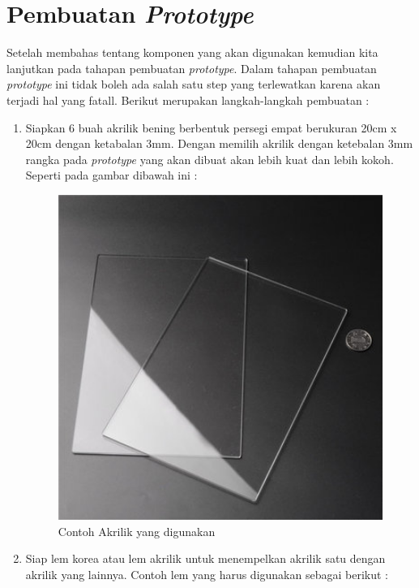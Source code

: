 \section{Pembuatan \textit{Prototype}}
Setelah membahas tentang komponen yang akan digunakan kemudian kita lanjutkan pada tahapan pembuatan \textit{prototype}. Dalam tahapan pembuatan \textit{prototype} ini tidak boleh ada salah satu step yang terlewatkan karena akan terjadi hal yang fatall. Berikut merupakan langkah-langkah pembuatan :
\begin{enumerate}
    \item Siapkan 6 buah akrilik bening berbentuk persegi empat berukuran 20cm x 20cm dengan ketabalan 3mm. Dengan memilih akrilik dengan ketebalan 3mm rangka pada \textit{prototype} yang akan dibuat akan lebih kuat dan lebih kokoh. Seperti pada gambar dibawah ini :
\begin{figure}[H]
\centering
\includegraphics[width=1\textwidth]{figures/akrilik.jpg}
\caption{Contoh Akrilik yang digunakan}
\label{print}
\end{figure}

\item Siap lem korea atau lem akrilik untuk menempelkan akrilik satu dengan akrilik yang lainnya. Contoh lem yang harus digunakan sebagai berikut :


\end{enumerate}
